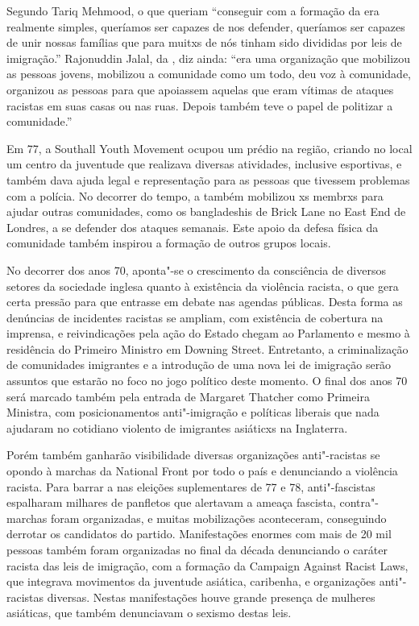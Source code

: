 Segundo Tariq Mehmood, o que queriam ``conseguir com a formação da  era realmente simples, queríamos ser capazes de nos defender, queríamos ser capazes de unir nossas famílias que para muitxs de nós tinham sido divididas por leis de imigração.'' Rajonuddin Jalal, da , diz ainda: ``era uma organização que mobilizou as pessoas jovens, mobilizou a comunidade como um todo, deu voz à comunidade, organizou as pessoas para que apoiassem aquelas que eram vítimas de ataques racistas em suas casas ou nas ruas. Depois também teve o papel de politizar a comunidade.''

Em 77, a Southall Youth Movement ocupou um prédio na região, criando no local um centro da juventude que realizava diversas atividades, inclusive esportivas, e também dava ajuda legal e representação para as pessoas que tivessem problemas com a polícia. No decorrer do tempo, a  também mobilizou xs membrxs para ajudar outras comunidades, como os bangladeshis de Brick Lane no East End de Londres, a se defender dos ataques semanais. Este apoio da defesa física da comunidade também inspirou a formação de outros grupos locais.

No decorrer dos anos 70, aponta"-se o crescimento da consciência de diversos setores da sociedade inglesa quanto à existência da violência racista, o que gera certa pressão para que entrasse em debate nas agendas públicas. Desta forma as denúncias de incidentes racistas se ampliam, com existência de cobertura na imprensa, e reivindicações pela ação do Estado chegam ao Parlamento e mesmo à residência do Primeiro Ministro em Downing Street. Entretanto, a criminalização de comunidades imigrantes e a introdução de uma nova lei de imigração serão assuntos que estarão no foco no jogo político deste momento. O final dos anos 70 será marcado também pela entrada de Margaret Thatcher como Primeira Ministra, com posicionamentos anti"-imigração e políticas liberais que nada ajudaram no cotidiano violento de imigrantes asiáticxs na Inglaterra.

Porém também ganharão visibilidade diversas organizações anti"-racistas se opondo à marchas da National Front por todo o país e denunciando a violência racista. Para barrar a  nas eleições suplementares de 77 e 78, anti"-fascistas espalharam milhares de panfletos que alertavam a ameaça fascista, contra"-marchas foram organizadas, e muitas mobilizações aconteceram, conseguindo derrotar os candidatos do partido. Manifestações enormes com mais de 20 mil pessoas também foram organizadas no final da década denunciando o caráter racista das leis de imigração, com a formação da Campaign Against Racist Laws, que integrava movimentos da juventude asiática, caribenha, e organizações anti"-racistas diversas. Nestas manifestações houve grande presença de mulheres asiáticas, que também denunciavam o sexismo destas leis.

